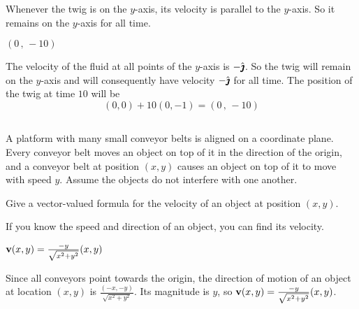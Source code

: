 \begin{hint} 
Whenever the twig is on the $y$-axis, its velocity is parallel to the $y$-axis.
So it remains on the $y$-axis for all time.
\end{hint}

\begin{answer} 
$(0\,,\,-10)$
\end{answer}

\begin{solution}
The velocity of the fluid at all points of the $y$-axis
is $-\hat{\pmb{\jmath}}$. So the twig will remain on the $y$-axis and will
consequently have velocity $-\hat{\pmb{\jmath}}$ for all time. The position
of the twig at time $10$ will be
\begin{equation*}
(0,0)+10(0,-1) = (0\,,\,-10)
\end{equation*}
\end{solution}


\subsection*{\Procedural}


\begin{question}
A platform with many small conveyor belts is aligned on a coordinate plane. Every conveyor belt moves an object on top of it in the direction of the origin, and a conveyor belt at position $(x,y)$ causes an object on top of it to move with speed $y$. Assume the objects do not interfere with one another.

 Give a vector-valued formula for the velocity of an object at position $(x,y)$.
 \end{question}

\begin{hint} 
If you know the speed and direction of an object, you can find its velocity.
\end{hint}

\begin{answer} 
$\mathbf{v}(x,y)=\frac{-y}{\sqrt{x^2+y^2}}(x,y)$
\end{answer}

\begin{solution}

\item  Since all conveyors point towards the origin, the direction of motion of an object at location $(x,y)$ is $\frac{(-x,-y)}{\sqrt{x^2+y^2}}$. Its magnitude is $y$, so $\mathbf{v}(x,y)=\frac{-y}{\sqrt{x^2+y^2}}(x,y)$.
\end{solution}

